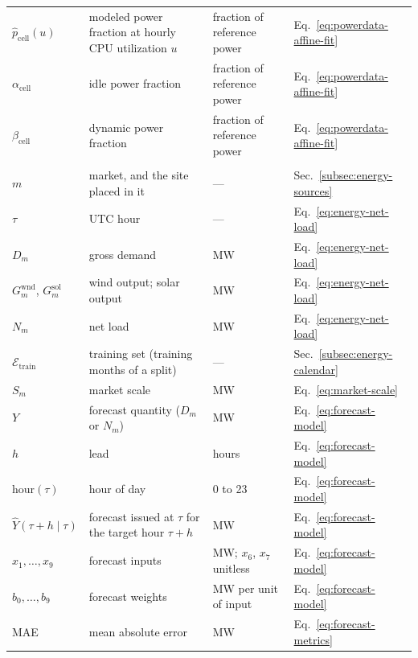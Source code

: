 \documentclass{UNCC-thesis}
\begin{document}
\begin{longtable}{@{}L{0.15\textwidth}L{0.37\textwidth}L{0.25\textwidth}L{0.13\textwidth}@{}}
  \(\widehat p_{\mathrm{cell}}(u)\) & modeled power fraction at hourly CPU utilization \(u\) & fraction of reference power & Eq.~\eqref{eq:powerdata-affine-fit} \\
  \(\alpha_{\mathrm{cell}}\) & idle power fraction & fraction of reference power & Eq.~\eqref{eq:powerdata-affine-fit} \\
  \(\beta_{\mathrm{cell}}\) & dynamic power fraction & fraction of reference power & Eq.~\eqref{eq:powerdata-affine-fit} \\
  \addlinespace
   \\
  \(m\) & market, and the site placed in it & --- & Sec.~\ref{subsec:energy-sources} \\
  \(\tau\) & UTC hour & --- & Eq.~\eqref{eq:energy-net-load} \\
  \(D_m\) & gross demand & MW & Eq.~\eqref{eq:energy-net-load} \\
  \(G^{\mathrm{wnd}}_m\), \(G^{\mathrm{sol}}_m\) & wind output; solar output & MW & Eq.~\eqref{eq:energy-net-load} \\
  \(N_m\) & net load & MW & Eq.~\eqref{eq:energy-net-load} \\
  \(\mathcal E_{\mathrm{train}}\) & training set (training months of a split) & --- & Sec.~\ref{subsec:energy-calendar} \\
  \(S_m\) & market scale & MW & Eq.~\eqref{eq:market-scale} \\
  \(Y\) & forecast quantity (\(D_m\) or \(N_m\)) & MW & Eq.~\eqref{eq:forecast-model} \\
  \(h\) & lead & hours & Eq.~\eqref{eq:forecast-model} \\
  \(\mathrm{hour}(\tau)\) & hour of day & 0 to 23 & Eq.~\eqref{eq:forecast-model} \\
  \(\widehat Y(\tau+h\mid\tau)\) & forecast issued at \(\tau\) for the target hour \(\tau+h\) & MW & Eq.~\eqref{eq:forecast-model} \\
  \(x_1,\dots,x_9\) & forecast inputs & MW; \(x_6\), \(x_7\) unitless & Eq.~\eqref{eq:forecast-model} \\
  \(b_0,\dots,b_9\) & forecast weights & MW per unit of input & Eq.~\eqref{eq:forecast-model} \\
  MAE & mean absolute error & MW & Eq.~\eqref{eq:forecast-metrics} \\

\end{longtable}
\end{document}
